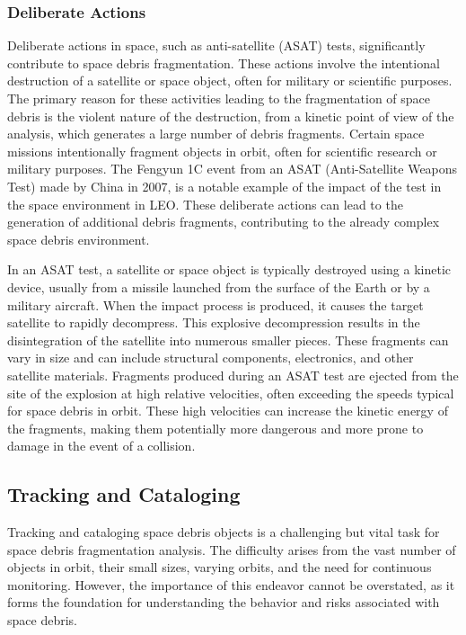 \documentclass[11pt]{article} %
\begin{document}
\subsubsection{Deliberate Actions}
Deliberate actions in space, such as anti-satellite (ASAT) tests, significantly contribute to space debris fragmentation. These actions involve the intentional destruction of a satellite or space object, often for military or scientific purposes. The primary reason for these activities leading to the fragmentation of space debris is the violent nature of the destruction, from a kinetic point of view of the analysis, which generates a large number of debris fragments. Certain space missions intentionally fragment objects in orbit, often for scientific research or military purposes. The Fengyun 1C event from an ASAT (Anti-Satellite Weapons Test) made by China in 2007, is a notable example of the impact of the test in the space environment in LEO. These deliberate actions can lead to the generation of additional debris fragments, contributing to the already complex space debris environment.

 In an ASAT test, a satellite or space object is typically destroyed using a kinetic device, usually from a missile launched from the surface of the Earth or by a military aircraft. When the impact process is produced, it causes the target satellite to rapidly decompress. This explosive decompression results in the disintegration of the satellite into numerous smaller pieces. These fragments can vary in size and can include structural components, electronics, and other satellite materials. Fragments produced during an ASAT test are ejected from the site of the explosion at high relative velocities, often exceeding the speeds typical for space debris in orbit. These high velocities can increase the kinetic energy of the fragments, making them potentially more dangerous and more prone to damage in the event of a collision.~\cite{sorge_orbital_2008}

\subsection{Tracking and Cataloging}
Tracking and cataloging space debris objects is a challenging but vital task for space debris fragmentation analysis. The difficulty arises from the vast number of objects in orbit, their small sizes, varying orbits, and the need for continuous monitoring. However, the importance of this endeavor cannot be overstated, as it forms the foundation for understanding the behavior and risks associated with space debris.
\end{document}

